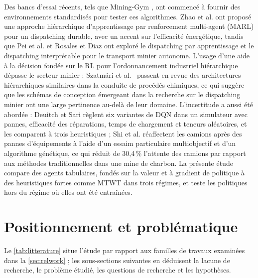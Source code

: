 \documentclass[11pt,a4paper]{article}
\newif\ifrevmarks
\newcommand{\revtag}[1]{\ifrevmarks\textsuperscript{\textcolor{red!70!black}{\scriptsize[#1]}}\fi}
\newcommand{\rev}[2]{\ifrevmarks{\color{revcolor}#2}\revtag{#1}\else#2\fi}
\newenvironment{revbloc}[1]{\par\ifrevmarks\color{revcolor}\noindent\revtag{#1}\ \fi}{\par}
\newif\ifcorrmarks
\newcommand{\corr}[1]{\ifcorrmarks\textcolor{corrcolor}{#1}\else#1\fi}
\begin{document}
Des bancs d'essai récents, tels que Mining-Gym \cite{Banerjee2025}, ont commencé à fournir des environnements standardisés pour tester ces algorithmes. Zhao et al. \cite{Zhao2025} ont proposé une approche hiérarchique d'apprentissage par renforcement multi-agent (MARL) pour un dispatching durable, avec un accent sur l'efficacité énergétique, tandis que Pei et al. \cite{Pei2025} et Rosales et Diaz \cite{FranciscoRosales2025} ont exploré le dispatching par apprentissage et le dispatching interprétable pour le transport minier autonome. L'usage d'une aide à la décision fondée sur le RL pour l'ordonnancement industriel hiérarchique dépasse le secteur minier : \rev{v3}{Szatmári et al.~\cite{KingaSzatmari2025} passent en revue} des architectures hiérarchiques similaires dans la conduite de procédés chimiques, ce qui suggère que les schémas de conception émergeant dans la recherche sur le dispatching minier ont une large pertinence au-delà de leur domaine. \corr{L'incertitude a aussi été abordée : Deuitch et Sari \cite{Deuitch2026} règlent six variantes de DQN dans un simulateur avec pannes, efficacité des réparations, temps de chargement et teneurs aléatoires, et les comparent à trois heuristiques ; Shi et al. \cite{Shi2026} réaffectent les camions après des pannes d'équipements à l'aide d'un essaim particulaire multiobjectif et d'un algorithme génétique, ce qui réduit de 30,4\,\% l'attente des camions par rapport aux méthodes traditionnelles dans une mine de charbon. La présente étude compare des agents tabulaires, fondés sur la valeur et à gradient de politique à des heuristiques fortes comme MTWT dans trois régimes, et teste les politiques hors du régime où elles ont été entraînées.}

\section{Positionnement et problématique}
\label{sec:positioning}

\begin{revbloc}{M24}
Le \cref{tab:litterature} situe l'étude par rapport aux familles de travaux examinées dans la \cref{sec:relwork} ; les sous-sections suivantes en déduisent la lacune de recherche, le problème étudié, les questions de recherche et les hypothèses.
\end{revbloc}
\end{document}
